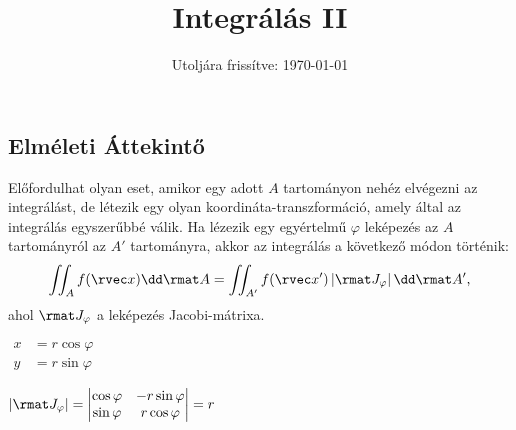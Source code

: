 \documentclass[a4paper, 12pt, fleqn]{scrartcl}
\title{Integrálás II}
\date{Utoljára frissítve: \today}
\begin{document}
\maketitle
\subsection{Elméleti Áttekintő}

\begin{blueBox}

  Előfordulhat olyan eset, amikor egy adott $A$ tartományon nehéz elvégezni az
  integrálást, de létezik egy olyan koordináta-transzformáció, amely által az
  integrálás egyszerűbbé válik. Ha lézezik egy egyértelmű $\varphi$ leképezés
  az $A$ tartományról az $A'$ tartományra, akkor az integrálás a következő
  módon történik:
  $$
    \iint_A f(\rvec x) \dd \rmat A
    =
    \iint_{A'} f(\rvec x') \left| \rmat J_{\varphi} \right| \dd \rmat A'
    \text,
  $$
  ahol $\rmat J_{\varphi}$ a leképezés Jacobi-mátrixa.


  \begin{minipage}{.3\textwidth}
  \end{minipage}\begin{minipage}{.25\textwidth}
    $\displaystyle
      \begin{aligned}
        x & = r \cos \varphi \\
        y & = r \sin \varphi
      \end{aligned}
    $
  \end{minipage}\begin{minipage}{.45\textwidth}
    $\displaystyle
      |\rmat J_{\varphi}| = \begin{vmatrix}
        \cos \varphi & -r \sin \varphi \\
        \sin \varphi & r \cos \varphi
      \end{vmatrix} = r
    $
  \end{minipage}


\end{blueBox}
\end{document}
